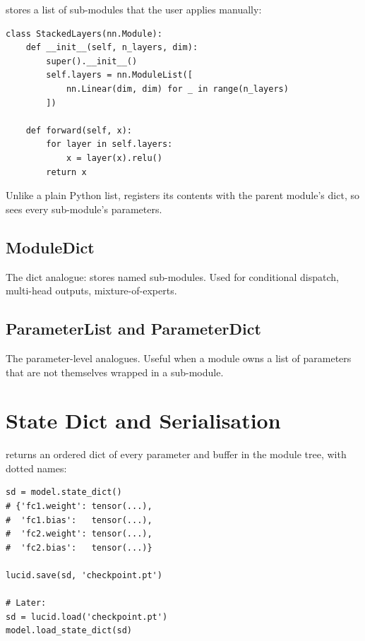  stores a list of sub-modules that the user
applies manually:

\begin{lstlisting}[style=lucid,language=LucidPython]
class StackedLayers(nn.Module):
    def __init__(self, n_layers, dim):
        super().__init__()
        self.layers = nn.ModuleList([
            nn.Linear(dim, dim) for _ in range(n_layers)
        ])

    def forward(self, x):
        for layer in self.layers:
            x = layer(x).relu()
        return x
\end{lstlisting}

Unlike a plain Python list,  registers its
contents with the parent module's  dict, so
 sees every sub-module's parameters.

\subsection{ModuleDict}
\label{ssec:module_system:moduledict}

The dict analogue:  stores named sub-modules. Used
for conditional dispatch, multi-head outputs, mixture-of-experts.

\subsection{ParameterList and ParameterDict}
\label{ssec:module_system:paramlist}

The parameter-level analogues. Useful when a module owns a list of
parameters that are not themselves wrapped in a sub-module.

\section{State Dict and Serialisation}
\label{sec:module_system:state_dict}

 returns an ordered dict of every
parameter and buffer in the module tree, with dotted names:

\begin{lstlisting}[style=lucid,language=LucidPython]
sd = model.state_dict()
# {'fc1.weight': tensor(...),
#  'fc1.bias':   tensor(...),
#  'fc2.weight': tensor(...),
#  'fc2.bias':   tensor(...)}

lucid.save(sd, 'checkpoint.pt')

# Later:
sd = lucid.load('checkpoint.pt')
model.load_state_dict(sd)
\end{lstlisting}

